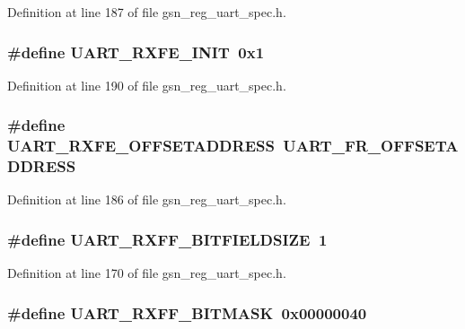Definition at line 187 of file gsn\_\-reg\_\-uart\_\-spec.h.

\hypertarget{a00575_aa085ad32f2d75e162339e99256a79d8f}{
\subsubsection[{UART\_\-RXFE\_\-INIT}]{\setlength{\rightskip}{0pt plus 5cm}\#define UART\_\-RXFE\_\-INIT~0x1}}
\label{a00575_aa085ad32f2d75e162339e99256a79d8f}


Definition at line 190 of file gsn\_\-reg\_\-uart\_\-spec.h.

\hypertarget{a00575_a1bc687513243386539793aa81feb860c}{
\subsubsection[{UART\_\-RXFE\_\-OFFSETADDRESS}]{\setlength{\rightskip}{0pt plus 5cm}\#define UART\_\-RXFE\_\-OFFSETADDRESS~UART\_\-FR\_\-OFFSETADDRESS}}
\label{a00575_a1bc687513243386539793aa81feb860c}


Definition at line 186 of file gsn\_\-reg\_\-uart\_\-spec.h.

\hypertarget{a00575_a4a26ea73ca1c8e1180add58b53280b44}{
\subsubsection[{UART\_\-RXFF\_\-BITFIELDSIZE}]{\setlength{\rightskip}{0pt plus 5cm}\#define UART\_\-RXFF\_\-BITFIELDSIZE~1}}
\label{a00575_a4a26ea73ca1c8e1180add58b53280b44}


Definition at line 170 of file gsn\_\-reg\_\-uart\_\-spec.h.

\hypertarget{a00575_a73d21cf48e50db0772e2fa5d8ec11137}{
\subsubsection[{UART\_\-RXFF\_\-BITMASK}]{\setlength{\rightskip}{0pt plus 5cm}\#define UART\_\-RXFF\_\-BITMASK~0x00000040}}
\label{a00575_a73d21cf48e50db0772e2fa5d8ec11137}


